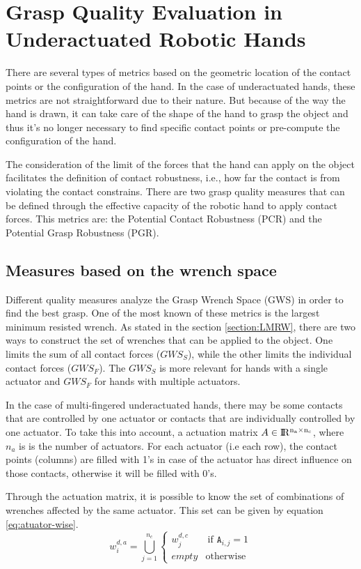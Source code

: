 \section{Grasp Quality Evaluation in Underactuated Robotic Hands}
There are several types of metrics based on the geometric location of the contact points or the configuration of the hand.
In the case of underactuated hands, these metrics are not straightforward due to their nature.
But because of the way the hand is drawn, it can take care of the shape of the hand to grasp the object and thus it's no longer necessary to find specific contact points or pre-compute the configuration of the hand. \par
The consideration of the limit of the forces that the hand can apply on the object facilitates the definition of contact robustness, i.e., how far the contact is from violating the contact constrains.
There are two grasp quality measures that can be defined through the effective capacity of the robotic hand to apply contact forces.
This metrics are: the Potential Contact Robustness (PCR) and the Potential Grasp Robustness (PGR).

\subsection{Measures based on the wrench space}
Different quality measures analyze the Grasp Wrench Space (GWS) in order to find the best grasp. One of the most known of these metrics is the largest minimum resisted wrench.
As stated in the section \ref{section:LMRW}, there are two ways to construct the set of wrenches that can be applied to the object. One limits the sum of all contact forces ($GWS_S$), while the other limits the individual contact forces ($GWS_F$).
The $GWS_S$ is more relevant for hands with a single actuator and $GWS_F$ for hands with multiple actuators. \par
In the case of multi-fingered underactuated hands, there may be some contacts that are controlled by one actuator or contacts that are individually  controlled by one actuator. 
To take this into account, a actuation matrix $A  \in \rm I\!R^{n_a \times n_c}$, where $n_a$ is is the number of actuators. For each actuator (i.e each row), the contact points (columns) are filled with 1's in case of the actuator has direct influence on those contacts, otherwise it will be filled with 0's.\par
Through the actuation matrix, it is possible to know the set of combinations of wrenches affected by the same actuator. This set can be given by equation \eqref{eq:atuator-wise}.
\begin{equation}\label{eq:atuator-wise}
    w_i^{d,a}= \bigcup_{j=1}^{n_c}
        \begin{cases}
        w_j^{d,c} & \ \text{if } \texttt{A}_{i,j} = 1\\
        \textit{empty} &  \text{otherwise}
    \end{cases}
\end{equation}

